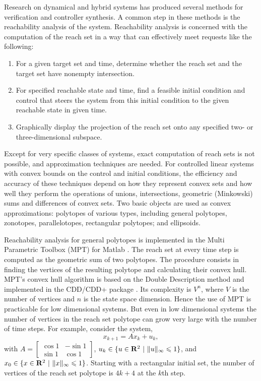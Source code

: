 Research on dynamical and hybrid systems has produced several methods
for verification and controller synthesis.
A common step in these methods is the reachability analysis of the system.
Reachability analysis is concerned with the  computation of the reach set
in  a way that can effectively meet requests like the following:
\begin{enumerate}
\item For a given target set and time, determine whether
the reach set and the target set have nonempty intersection.
\item For specified reachable state and time,
find a feasible initial condition and control that steers the system
from this initial condition to the given reachable state in given time.
\item Graphically display the projection of the reach set onto
any specified two- or three-dimensional subspace.
\end{enumerate}
Except for very specific classes of systems, exact computation of reach sets is
not possible, and approximation techniques are needed.
For controlled linear systems with convex bounds on the control
and initial conditions, the efficiency and accuracy of these techniques depend
on how they represent convex sets and how well they perform the operations
of unions, intersections, geometric (Minkowski) sums and differences
of convex sets.
Two basic objects are used as convex approximations:
polytopes of various types, including general polytopes, zonotopes,
parallelotopes, rectangular polytopes; and ellipsoids.

Reachability analysis for general polytopes is implemented in the
Multi Parametric Toolbox (MPT) for Matlab \cite{morari, mpt}.
The reach set at every time step is computed as the geometric sum
of two polytopes. The procedure consists in finding the vertices
of the resulting polytope and calculating their convex hull.
MPT's convex hull algorithm is based on the Double Description
method \cite{motzkin} and implemented in the CDD/CDD+ package \cite{cdd}.
Its complexity is $V^n$, where $V$ is the number of vertices and $n$ is the
state space dimension. Hence the use of MPT is practicable for low dimensional
systems. But even in low dimensional systems the number of vertices in
the reach set polytope can grow very large with the number
of time steps. For example, consider the  system,
\[ x_{k+1} = Ax_k + u_k ,\]
with $A=\left[\begin{array}{cc}
\cos 1 & -\sin 1\\
\sin 1 & \cos 1\end{array}\right]$,
$u_k \in \{u\in {\bf R}^2 ~|~ \|u\|_{\infty}\leq 1\}$, and
$x_0 \in \{x\in {\bf R}^2 ~|~ \|x\|_{\infty}\leq 1\}$. Starting with a
rectangular initial set, the number of vertices of the reach set polytope
is $4k + 4$ at the $k$th step.


